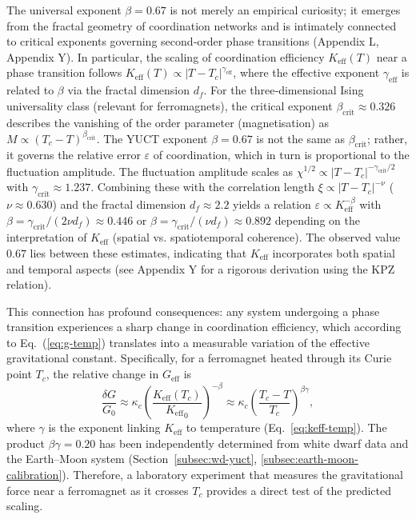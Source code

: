 \documentclass[12pt]{article}
\theoremstyle{remark}
\newcommand{\Keff}{K_{\mathrm{eff}}}
\begin{document}
	The universal exponent \(\beta = 0.67\) is not merely an empirical curiosity; it emerges from the fractal geometry of coordination networks and is intimately connected to critical exponents governing second‑order phase transitions (Appendix L, Appendix Y). In particular, the scaling of coordination efficiency \(\Keff(T)\) near a phase transition follows \(\Keff(T) \propto |T - T_c|^{\gamma_{\mathrm{eff}}}\), where the effective exponent \(\gamma_{\mathrm{eff}}\) is related to \(\beta\) via the fractal dimension \(d_f\). For the three‑dimensional Ising universality class (relevant for ferromagnets), the critical exponent \(\beta_{\mathrm{crit}} \approx 0.326\) describes the vanishing of the order parameter (magnetisation) as \(M \propto (T_c - T)^{\beta_{\mathrm{crit}}}\). The YUCT exponent \(\beta = 0.67\) is not the same as \(\beta_{\mathrm{crit}}\); rather, it governs the relative error \(\varepsilon\) of coordination, which in turn is proportional to the fluctuation amplitude. The fluctuation amplitude scales as \(\chi^{1/2} \propto |T - T_c|^{-\gamma_{\mathrm{crit}}/2}\) with \(\gamma_{\mathrm{crit}} \approx 1.237\). Combining these with the correlation length \(\xi \propto |T - T_c|^{-\nu}\) (\(\nu \approx 0.630\)) and the fractal dimension \(d_f \approx 2.2\) yields a relation \(\varepsilon \propto \Keff^{-\beta}\) with \(\beta = \gamma_{\mathrm{crit}}/(2\nu d_f) \approx 0.446\) or \(\beta = \gamma_{\mathrm{crit}}/(\nu d_f) \approx 0.892\) depending on the interpretation of \(\Keff\) (spatial vs. spatiotemporal coherence). The observed value \(0.67\) lies between these estimates, indicating that \(\Keff\) incorporates both spatial and temporal aspects (see Appendix Y for a rigorous derivation using the KPZ relation).
	
	This connection has profound consequences: any system undergoing a phase transition experiences a sharp change in coordination efficiency, which according to Eq.~(\ref{eq:g-temp}) translates into a measurable variation of the effective gravitational constant. Specifically, for a ferromagnet heated through its Curie point \(T_c\), the relative change in \(G_{\mathrm{eff}}\) is
	\[
	\frac{\delta G}{G_0} \approx \kappa_c \left( \frac{\Keff(T_c)}{{\Keff}_{0}} \right)^{-\beta} \approx \kappa_c \left( \frac{T_c - T}{T_c} \right)^{\beta\gamma},
	\]
	where \(\gamma\) is the exponent linking \(\Keff\) to temperature (Eq.~\ref{eq:keff-temp}). The product \(\beta\gamma = 0.20\) has been independently determined from white dwarf data and the Earth–Moon system (Section~\ref{subsec:wd-yuct}, \ref{subsec:earth-moon-calibration}). Therefore, a laboratory experiment that measures the gravitational force near a ferromagnet as it crosses \(T_c\) provides a direct test of the predicted scaling.
	
\end{document}
